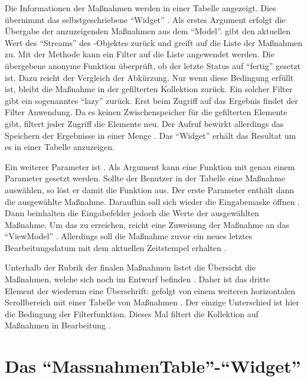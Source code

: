 Die Informationen der Maßnahmen werden in einer Tabelle angezeigt.
Dies übernimmt das selbstgeschriebene \enquote{Widget}  .
Als erstes Argument erfolgt die Übergabe der anzuzeigenden Maßnahmen aus dem \enquote{Model}.
 gibt den aktuellen Wert des \enquote{Streams} des -Objektes zurück und greift auf die Liste der Maßnahmen zu.
Mit der Methode   kann ein Filter auf die Liste angewendet werden.
Die übergebene anonyme Funktion  überprüft, ob der letzte Status auf \enquote{fertig} gesetzt ist.
Dazu reicht der Vergleich der Abkürzung.
Nur wenn diese Bedingung erfüllt ist,
bleibt die Maßnahme in der gefilterten Kollektion zurück.
Ein solcher Filter gibt ein sogenanntes \enquote{lazy}  zurück.
Erst beim Zugriff auf das Ergebnis findet der Filter Anwendung.
Da es keinen Zwischenspeicher für die gefilterten Elemente gibt,
filtert jeder Zugriff die Elemente neu.
Der Aufruf  bewirkt allerdings das Speichern der Ergebnisse in einer Menge .
Das \enquote{Widget}  erhält das Resultat um es in einer Tabelle anzuzeigen.

Ein weiterer Parameter ist  .
Als Argument kann eine Funktion mit genau einem Parameter gesetzt werden.
Sollte der Benutzer in der Tabelle eine Maßnahme auswählen, so löst er damit die Funktion aus.
Der erste Parameter enthält dann die ausgewählte Maßnahme.
Daraufhin soll sich wieder die Eingabemaske öffnen .
Dann beinhalten die Eingabefelder jedoch die Werte der ausgewählten Maßnahme.
Um das zu erreichen, reicht eine Zuweisung der Maßnahme an das \enquote{ViewModel} .
Allerdings soll die Maßnahme zuvor ein neues letztes Bearbeitungsdatum mit dem aktuellen Zeitstempel erhalten .

Unterhalb der Rubrik der finalen Maßnahmen listet die Übersicht die Maßnahmen, welche sich noch im Entwurf befinden .
Daher ist das dritte Element der  wiederum eine Überschrift:   gefolgt von einem weiteren horizontalen Scrollbereich  mit einer Tabelle von Maßnahmen .
Der einzige Unterschied ist hier die Bedingung der Filterfunktion.
Dieses Mal filtert die Kollektion auf Maßnahmen in Bearbeitung .


\clearpage
\section{Das \enquote{MassnahmenTable}-\enquote{Widget}}

